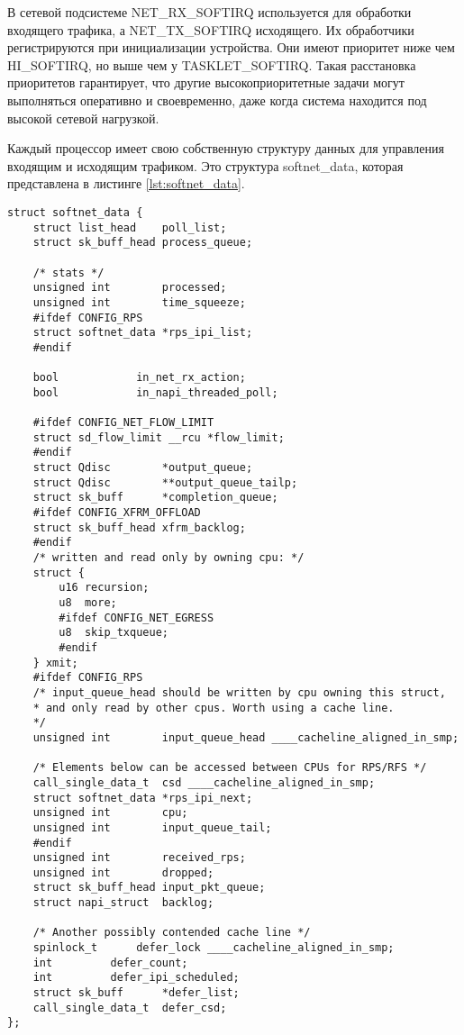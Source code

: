 В сетевой подсистеме NET\_RX\_SOFTIRQ используется для обработки входящего трафика, а NET\_TX\_SOFTIRQ исходящего. Их обработчики регистрируются при инициализации устройства. Они имеют приоритет ниже чем HI\_SOFTIRQ, но выше чем у TASKLET\_SOFTIRQ. Такая расстановка приоритетов гарантирует, что другие высокоприоритетные задачи могут выполняться оперативно и своевременно, даже когда система находится под высокой сетевой нагрузкой. 

Каждый процессор имеет свою собственную структуру данных для управления входящим и исходящим трафиком. Это структура  softnet\_data, которая представлена в листинге \ref{lst:softnet_data}.

\begin{center}
	\captionsetup{justification=raggedright,singlelinecheck=off}
	\begin{lstlisting}[label=lst:softnet_data,caption=Структуры softnet\_data]
struct softnet_data {
	struct list_head	poll_list;
	struct sk_buff_head	process_queue;
	
	/* stats */
	unsigned int		processed;
	unsigned int		time_squeeze;
	#ifdef CONFIG_RPS
	struct softnet_data	*rps_ipi_list;
	#endif
	
	bool			in_net_rx_action;
	bool			in_napi_threaded_poll;
	
	#ifdef CONFIG_NET_FLOW_LIMIT
	struct sd_flow_limit __rcu *flow_limit;
	#endif
	struct Qdisc		*output_queue;
	struct Qdisc		**output_queue_tailp;
	struct sk_buff		*completion_queue;
	#ifdef CONFIG_XFRM_OFFLOAD
	struct sk_buff_head	xfrm_backlog;
	#endif
	/* written and read only by owning cpu: */
	struct {
		u16 recursion;
		u8  more;
		#ifdef CONFIG_NET_EGRESS
		u8  skip_txqueue;
		#endif
	} xmit;
	#ifdef CONFIG_RPS
	/* input_queue_head should be written by cpu owning this struct,
	* and only read by other cpus. Worth using a cache line.
	*/
	unsigned int		input_queue_head ____cacheline_aligned_in_smp;
	
	/* Elements below can be accessed between CPUs for RPS/RFS */
	call_single_data_t	csd ____cacheline_aligned_in_smp;
	struct softnet_data	*rps_ipi_next;
	unsigned int		cpu;
	unsigned int		input_queue_tail;
	#endif
	unsigned int		received_rps;
	unsigned int		dropped;
	struct sk_buff_head	input_pkt_queue;
	struct napi_struct	backlog;
	
	/* Another possibly contended cache line */
	spinlock_t		defer_lock ____cacheline_aligned_in_smp;
	int			defer_count;
	int			defer_ipi_scheduled;
	struct sk_buff		*defer_list;
	call_single_data_t	defer_csd;
};		
	\end{lstlisting}
\end{center}
\FloatBarrier

